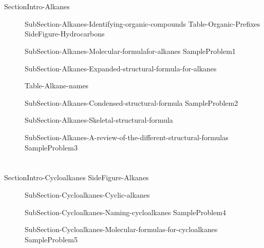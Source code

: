 \documentclass[main.tex]{subfiles}
\begin{document}
\section{\color{blue!30!black}{Alkanes}}
{SectionIntro-Alkanes}
\sloppy\begin{description}
\item[]{SubSection-Alkanes-Identifying-organic-compounds}
{Table-Organic-Prefixes}
{SideFigure-Hydrocarbons}
\item[]{SubSection-Alkanes-Molecular-formulafor-alkanes}
{SampleProblem1}
\item[] {SubSection-Alkanes-Expanded-structural-formula-for-alkanes}
  
 {Table-Alkane-names}
\item[]{SubSection-Alkanes-Condensed-structural-formula}
{SampleProblem2}
\item[]{SubSection-Alkanes-Skeletal-structural-formula}
\item[]{SubSection-Alkanes-A-review-of-the-different-structural-formulas}
{SampleProblem3}
\hspace{-5cm}{Figure-Skeletal-expanded-molecular}

\end{description}






\section{\color{blue!30!black}{Cycloalkanes}}
{SectionIntro-Cycloalkanes}
{SideFigure-Alkanes}

\sloppy\begin{description}

\item[] {SubSection-Cycloalkanes-Cyclic-alkanes}
\item[]{SubSection-Cycloalkanes-Naming-cycloalkanes}
{SampleProblem4}
\item[]{SubSection-Cycloalkanes-Molecular-formulas-for-cycloalkanes}
{SampleProblem5}
\end{description}
\end{document}
